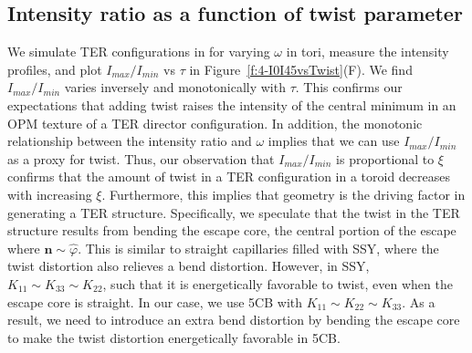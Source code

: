\subsection{Intensity ratio as a function of twist parameter}
We simulate TER configurations in for varying $\omega$ in tori, measure the intensity profiles, and plot $I_{max}/I_{min}$ vs $\tau$ in Figure~\ref{f:4-I0I45vsTwist}(F).
We find $I_{max}/I_{min}$ varies inversely and monotonically with $\tau$.
This confirms our expectations that adding twist raises the intensity of the central minimum in an OPM texture of a TER director configuration.
In addition, the monotonic relationship between the intensity ratio and $\omega$ implies that we can use $I_{max}/I_{min}$ as a proxy for twist.
Thus, our observation that  $I_{max}/I_{min}$ is proportional to $\xi$ confirms that the amount of twist in a TER configuration in a toroid decreases with increasing $\xi$.
Furthermore, this implies that geometry is the driving factor in generating a TER structure.
Specifically, we speculate that the twist in the TER structure results from bending the escape core, the central portion of the escape where $\mathbf{n} \sim \hat{\varphi}$.
This is similar to straight capillaries filled with SSY, where the twist distortion also relieves a bend distortion.
However, in SSY, $K_{11} \sim K_{33} \sim K_{22}$, such that it is energetically favorable to twist, even when the escape core is straight.
In our case, we use 5CB with $K_{11} \sim K_{22} \sim K_{33}$.
As a result, we need to introduce an extra bend distortion by bending the escape core to make the twist distortion energetically favorable in 5CB.


